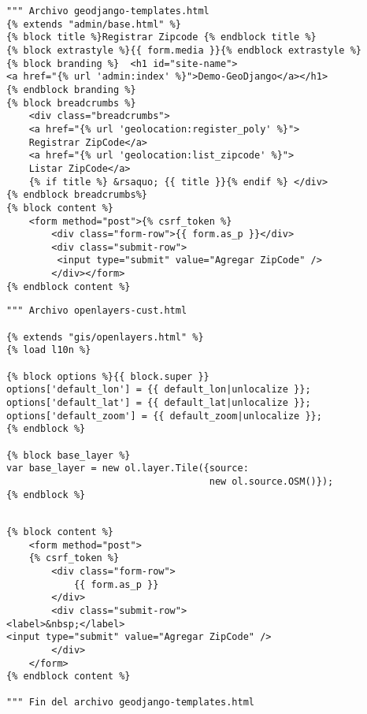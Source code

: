 \documentclass[xcolor=dvipsnames]{beamer}
\begin{document}
\begin{frame}[fragile]
\begin{verbatim}
""" Archivo geodjango-templates.html
{% extends "admin/base.html" %}
{% block title %}Registrar Zipcode {% endblock title %}
{% block extrastyle %}{{ form.media }}{% endblock extrastyle %}
{% block branding %}  <h1 id="site-name">
<a href="{% url 'admin:index' %}">Demo-GeoDjango</a></h1>
{% endblock branding %}
{% block breadcrumbs %}
    <div class="breadcrumbs">
    <a href="{% url 'geolocation:register_poly' %}">
    Registrar ZipCode</a>
    <a href="{% url 'geolocation:list_zipcode' %}">
    Listar ZipCode</a>
    {% if title %} &rsaquo; {{ title }}{% endif %} </div>
{% endblock breadcrumbs%}
{% block content %}
    <form method="post">{% csrf_token %}
        <div class="form-row">{{ form.as_p }}</div>
        <div class="submit-row">
         <input type="submit" value="Agregar ZipCode" />
        </div></form>
{% endblock content %}
\end{verbatim}
\end{frame}

\begin{frame}[fragile]
\begin{verbatim}
""" Archivo openlayers-cust.html

{% extends "gis/openlayers.html" %}
{% load l10n %}

{% block options %}{{ block.super }}
options['default_lon'] = {{ default_lon|unlocalize }};
options['default_lat'] = {{ default_lat|unlocalize }};
options['default_zoom'] = {{ default_zoom|unlocalize }};
{% endblock %}

{% block base_layer %}
var base_layer = new ol.layer.Tile({source: 
                                    new ol.source.OSM()});
{% endblock %}

\end{verbatim}
\end{frame}

\begin{frame}[fragile]
\begin{verbatim}

{% block content %}
    <form method="post">
    {% csrf_token %}
        <div class="form-row">
            {{ form.as_p }}
        </div>
        <div class="submit-row">
<label>&nbsp;</label>
<input type="submit" value="Agregar ZipCode" />
        </div>
    </form>
{% endblock content %}

""" Fin del archivo geodjango-templates.html

\end{verbatim}
\end{frame}
\end{document}
